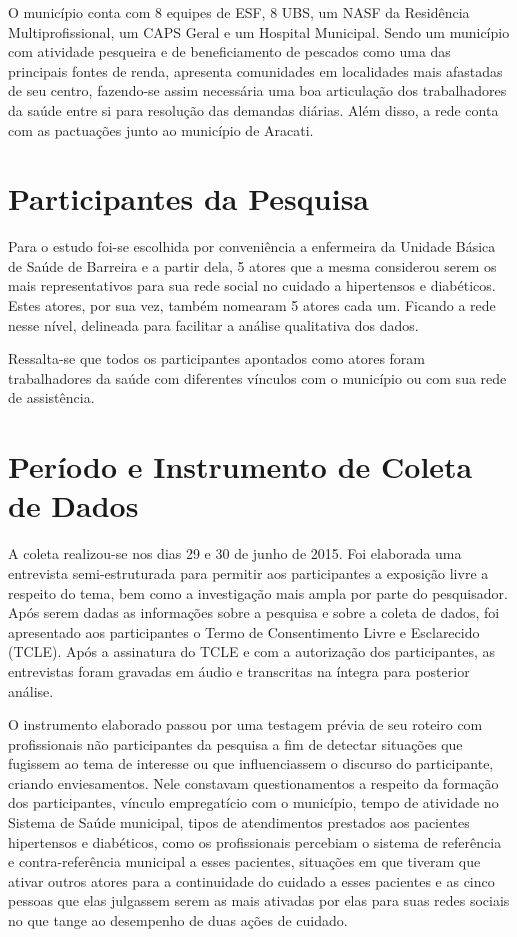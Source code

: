 O município conta com 8 equipes de ESF, 8 UBS, um NASF da Residência Multiprofissional, um CAPS Geral e um Hospital Municipal.  Sendo um município com atividade pesqueira e de beneficiamento de pescados como uma das principais fontes de renda, apresenta comunidades em localidades mais afastadas de seu centro, fazendo-se assim necessária uma boa articulação dos trabalhadores da saúde entre si para resolução das demandas diárias. Além disso, a rede conta com as pactuações junto ao município de Aracati.  

\section{Participantes da Pesquisa}
Para o estudo foi-se escolhida por conveniência a enfermeira da Unidade Básica de Saúde de Barreira e a partir dela, 5 atores que a mesma considerou serem os mais representativos para sua rede social no cuidado a hipertensos e diabéticos. Estes atores, por sua vez, também nomearam 5 atores cada um. Ficando a rede nesse nível, delineada para facilitar a análise qualitativa dos dados. 

Ressalta-se que todos os participantes apontados como atores foram trabalhadores da saúde com diferentes vínculos com o município ou com sua rede de assistência. 

\section{Período e Instrumento de Coleta de Dados}
A coleta realizou-se nos dias 29 e 30 de junho de 2015. Foi elaborada uma entrevista semi-estruturada para permitir aos participantes a exposição livre a respeito do tema, bem como a investigação mais ampla por parte do pesquisador. Após serem dadas as informações sobre a pesquisa e sobre a coleta de dados, foi apresentado aos participantes o Termo de Consentimento Livre e Esclarecido (TCLE). Após a assinatura do TCLE  e com a autorização dos participantes, as entrevistas foram gravadas em áudio e transcritas na íntegra para posterior análise. 

O instrumento elaborado passou por uma testagem prévia de seu roteiro com profissionais não participantes da pesquisa a fim de detectar situações que fugissem ao tema de interesse ou que influenciassem o discurso do participante, criando enviesamentos. Nele constavam questionamentos a respeito da formação dos participantes, vínculo empregatício com o município, tempo de atividade no Sistema de Saúde municipal, tipos de atendimentos prestados aos pacientes hipertensos e diabéticos, como os profissionais percebiam o sistema de referência e contra-referência municipal a esses pacientes, situações em que tiveram que ativar outros atores para a continuidade do cuidado a esses pacientes e as cinco pessoas que elas julgassem serem as mais ativadas por elas para suas redes sociais no que tange ao desempenho de duas ações de cuidado.  


